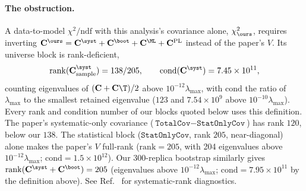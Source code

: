 \paragraph{The obstruction.} A data-to-model $\chi^{2}/\mathrm{ndf}$ with this analysis's covariance alone, $\chi^{2}_{\ours}$, requires inverting $\mathbf{C}^{\ours} = \mathbf{C}^{\syst} + \mathbf{C}^{\boot} + \mathbf{C}^{\ML} + \mathbf{C}^{\mathrm{PL}}$ instead of the paper's $V$. Its universe block is rank-deficient,
\begin{equation}
\mathrm{rank}(\mathbf{C}^{\syst}_{\text{sample}}) = 138 / 205,
\qquad
\mathrm{cond}(\mathbf{C}^{\syst}) = 7.45\times10^{11}, %
\end{equation}
counting eigenvalues of $(\mathbf{C}+\mathbf{C}\T)/2$ above $10^{-12}\lambda_{\max}$, with $\mathrm{cond}$ the ratio of $\lambda_{\max}$ to the smallest retained eigenvalue ($123$ and $7.54\times10^{9}$ above $10^{-10}\lambda_{\max}$). Every rank and condition number of our blocks quoted below uses this definition. The paper's systematic-only covariance ($\texttt{TotalCov}-\texttt{StatOnlyCov}$) has rank $120$, below our $138$. The statistical block ($\texttt{StatOnlyCov}$, rank $205$, near-diagonal) alone makes the paper's $V$ full-rank ($\mathrm{rank}=205$, with 204 eigenvalues above $10^{-12}\lambda_{\max}$; $\mathrm{cond}=1.5\times10^{12}$). Our $300$-replica bootstrap similarly gives $\mathrm{rank}(\mathbf{C}^{\syst}+\mathbf{C}^{\boot})=205$ (eigenvalues above $10^{-12}\lambda_{\max}$; $\mathrm{cond}=7.95\times10^{11}$ by the definition above). See Ref.~\cite{NoteRecords2026} for systematic-rank diagnostics. 

